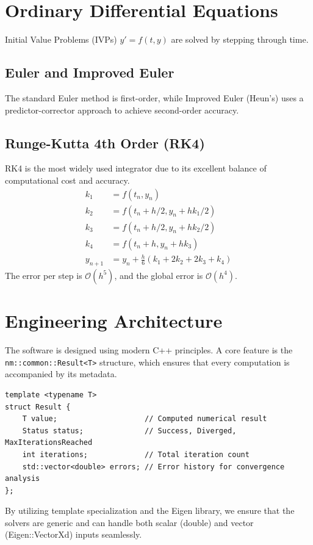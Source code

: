 \documentclass[11pt,a4paper]{article}
\begin{document}
\section{Ordinary Differential Equations}
Initial Value Problems (IVPs) $y' = f(t, y)$ are solved by stepping through time.

\subsection{Euler and Improved Euler}
The standard Euler method is first-order, while Improved Euler (Heun's) uses a predictor-corrector approach to achieve second-order accuracy.

\subsection{Runge-Kutta 4th Order (RK4)}
RK4 is the most widely used integrator due to its excellent balance of computational cost and accuracy.
\begin{align}
    k_1 &= f(t_n, y_n) \\
    k_2 &= f(t_n + h/2, y_n + h k_1/2) \\
    k_3 &= f(t_n + h/2, y_n + h k_2/2) \\
    k_4 &= f(t_n + h, y_n + h k_3) \\
    y_{n+1} &= y_n + \frac{h}{6}(k_1 + 2k_2 + 2k_3 + k_4)
\end{align}
The error per step is $\mathcal{O}(h^5)$, and the global error is $\mathcal{O}(h^4)$.

\section{Engineering Architecture}
The software is designed using modern C++ principles. A core feature is the \texttt{nm::common::Result<T>} structure, which ensures that every computation is accompanied by its metadata.

\begin{lstlisting}[caption=Definition of the Result structure]
template <typename T>
struct Result {
    T value;                    // Computed numerical result
    Status status;              // Success, Diverged, MaxIterationsReached
    int iterations;             // Total iteration count
    std::vector<double> errors; // Error history for convergence analysis
};
\end{lstlisting}

By utilizing template specialization and the Eigen library, we ensure that the solvers are generic and can handle both scalar (double) and vector (Eigen::VectorXd) inputs seamlessly.
\end{document}
